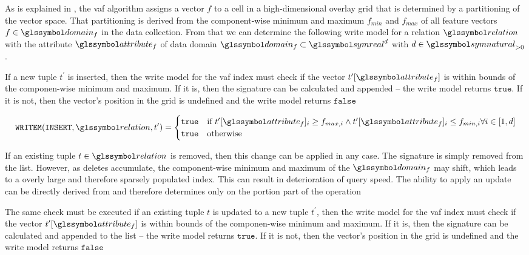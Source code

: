 As is explained in , the \acrshort{vaf} algorithm assigns a vector $f$ to a cell in a high-dimensional overlay grid that is determined by a partitioning of the vector space. That partitioning is derived from the component-wise minimum and maximum $f_{min}$ and $f_{max}$ of all feature vectors $f \in \domain_f$ in the data collection. From that we can determine the following write model for a relation $\relation$ with the attribute $\attribute_f$ of data domain $\domain_f \subset \symreal^d$ with $d \in \symnatural_{>0}$.

If a new tuple $t^{\prime}$ is inserted, then the write model for the \acrshort{vaf} index must check if the vector $t^{\prime}[\attribute_f]$ is within bounds of the componen-wise minimum and maximum. If it is, then the signature can be calculated and appended -- the write model returns $\mathtt{true}$. If it is not, then the vector's position in the grid is undefined and the write model returns $\mathtt{false}$

\begin{equation}
    \mathtt{WRITEM}(\mathtt{INSERT}, \relation, t^{\prime}) =
    \begin{cases}
        \mathtt{true} & \text{if } t^{\prime}[\attribute_f]_i \geq f_{max,i} \wedge t^{\prime}[\attribute_f]_i \leq f_{min,i} \forall i \in [1,d]\\
        \mathtt{true} & \text{otherwise}
    \end{cases}
\end{equation}

If an existing tuple $t \in \relation$ is removed, then this change can be applied in any case. The signature is simply removed from the list. However, as deletes accumulate, the component-wise minimum and maximum of the $\domain_f$ may shift, which leads to a overly large and therefore sparsely populated index. This can result in deterioration of query speed. The ability to apply an update can be directly derived from  and therefore determines only on the portion part of the operation

The same check must be executed if an existing tuple $t$ is updated to a new tuple $t^{\prime}$, then the write model for the \acrshort{vaf} index must check if the vector $t^{\prime}[\attribute_f]$ is within bounds of the componen-wise minimum and maximum. If it is, then the signature can be calculated and appended to the list -- the write model returns $\mathtt{true}$. If it is not, then the vector's position in the grid is undefined and the write model returns $\mathtt{false}$

